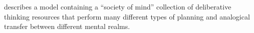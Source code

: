 \cite{mueller:1990} describes a model containing a ``society of mind''
collection of deliberative thinking resources that perform many
different types of planning and analogical transfer between different
mental realms.
























































